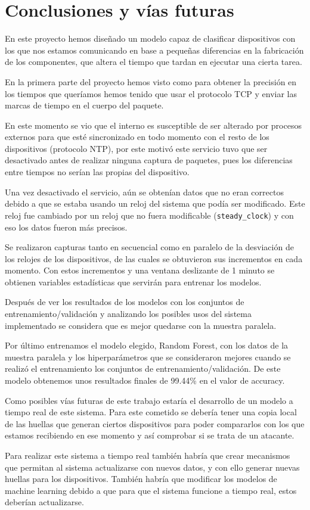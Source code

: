 
\chapter{Conclusiones y vías futuras}

En este proyecto hemos diseñado un modelo capaz de clasificar dispositivos con los que nos estamos comunicando en base a pequeñas diferencias en la fabricación de los componentes, que altera el tiempo que tardan en ejecutar una cierta tarea.

En la primera parte del proyecto hemos visto como para obtener la precisión en los tiempos que queríamos hemos tenido que usar el protocolo TCP y enviar las marcas de tiempo en el cuerpo del paquete. 

En este momento se vio que el interno es susceptible de ser alterado por procesos externos para que esté sincronizado en todo momento con el resto de los dispositivos (protocolo NTP), por este motivó este servicio tuvo que ser desactivado antes de realizar ninguna captura de paquetes, pues los diferencias entre tiempos no serían las propias del dispositivo.

Una vez desactivado el servicio, aún se obtenían datos que no eran correctos debido a que se estaba usando un reloj del sistema que podía ser modificado. Este reloj fue cambiado por un reloj que no fuera modificable (\texttt{steady\_clock}) y con eso los datos fueron más precisos.

Se realizaron capturas tanto en secuencial como en paralelo de la desviación de los relojes de los dispositivos, de las cuales se obtuvieron sus incrementos en cada momento. Con estos incrementos y una ventana deslizante de 1 minuto se obtienen variables estadísticas que servirán para entrenar los modelos.

Después de ver los resultados de los modelos con los conjuntos de entrenamiento/validación y analizando los posibles usos del sistema implementado se considera que es mejor quedarse con la muestra paralela. 

Por último entrenamos el modelo elegido, Random Forest, con los datos de la muestra paralela y los hiperparámetros que se consideraron mejores cuando se realizó el entrenamiento los conjuntos de entrenamiento/validación. De este modelo obtenemos unos resultados finales de 99.44\% en el valor de accuracy.

Como posibles vías futuras de este trabajo estaría el desarrollo de un modelo a tiempo real de este sistema. Para este cometido se debería tener una copia local de las huellas que generan ciertos dispositivos para poder compararlos con los que estamos recibiendo en ese momento y así comprobar si se trata de un atacante.

Para realizar este sistema a tiempo real también habría que crear mecanismos que permitan al sistema actualizarse con nuevos datos, y con ello generar nuevas huellas para los dispositivos. También habría que modificar los modelos de machine learning debido a que para que el sistema funcione a tiempo real, estos deberían actualizarse. 


